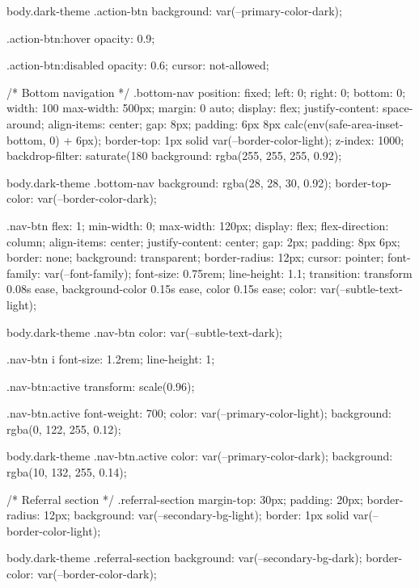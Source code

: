   body.dark-theme .action-btn {
    background: var(--primary-color-dark);
  }
  
  .action-btn:hover {
    opacity: 0.9;
  }
  
  .action-btn:disabled {
    opacity: 0.6;
    cursor: not-allowed;
  }
  
  /* Bottom navigation */
  .bottom-nav {
    position: fixed;
    left: 0;
    right: 0;
    bottom: 0;
    width: 100%
    max-width: 500px;
    margin: 0 auto;
    display: flex;
    justify-content: space-around;
    align-items: center;
    gap: 8px;
    padding: 6px 8px calc(env(safe-area-inset-bottom, 0) + 6px);
    border-top: 1px solid var(--border-color-light);
    z-index: 1000;
    backdrop-filter: saturate(180%
    background: rgba(255, 255, 255, 0.92);
  }
  
  body.dark-theme .bottom-nav {
    background: rgba(28, 28, 30, 0.92);
    border-top-color: var(--border-color-dark);
  }
  
  .nav-btn {
    flex: 1;
    min-width: 0;
    max-width: 120px;
    display: flex;
    flex-direction: column;
    align-items: center;
    justify-content: center;
    gap: 2px;
    padding: 8px 6px;
    border: none;
    background: transparent;
    border-radius: 12px;
    cursor: pointer;
    font-family: var(--font-family);
    font-size: 0.75rem;
    line-height: 1.1;
    transition: transform 0.08s ease, background-color 0.15s ease, color 0.15s ease;
    color: var(--subtle-text-light);
  }
  
  body.dark-theme .nav-btn {
    color: var(--subtle-text-dark);
  }
  
  .nav-btn i {
    font-size: 1.2rem;
    line-height: 1;
  }
  
  .nav-btn:active {
    transform: scale(0.96);
  }
  
  .nav-btn.active {
    font-weight: 700;
    color: var(--primary-color-light);
    background: rgba(0, 122, 255, 0.12);
  }
  
  body.dark-theme .nav-btn.active {
    color: var(--primary-color-dark);
    background: rgba(10, 132, 255, 0.14);
  }
  
  /* Referral section */
  .referral-section {
    margin-top: 30px;
    padding: 20px;
    border-radius: 12px;
    background: var(--secondary-bg-light);
    border: 1px solid var(--border-color-light);
  }
  
  body.dark-theme .referral-section {
    background: var(--secondary-bg-dark);
    border-color: var(--border-color-dark);
  }
  
